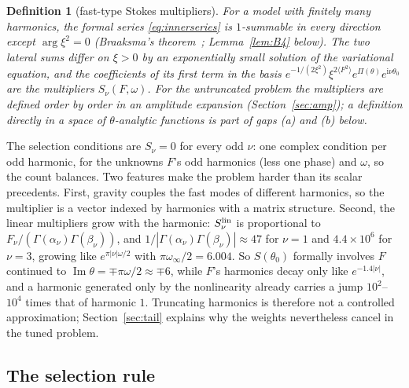 \documentclass{amsart}
\numberwithin{equation}{section}
\theoremstyle{plain}
\newtheorem{definition}{Definition}[section]
\theoremstyle{definition}
\theoremstyle{remark}
\newcommand{\winf}{\omega_\infty}
\newcommand{\im}{\operatorname{Im}}
\newcommand{\iu}{\mathrm{i}}
\begin{document}
\begin{definition}[fast-type Stokes multipliers]\label{def:mult}
For a model with finitely many harmonics, the formal series \eqref{eq:innerseries} is $1$-summable in every direction
except $\arg\xi^2 = 0$ (Braaksma's theorem~\cite{Braaksma1992}; Lemma~\ref{lem:B4} below). The two lateral sums differ
on $\xi > 0$ by an exponentially small solution of the variational equation, and the coefficients of its first term in
the basis $e^{-1/(2\xi^2)}\xi^{2\langle F^2\rangle}e^{\Pi(\theta)}e^{\iu\nu\theta_0}$ are the multipliers $S_\nu(F,\omega)$.
For the untruncated problem the multipliers are defined order by order in an amplitude expansion
(Section~\ref{sec:amp}); a definition directly in a space of $\theta$-analytic functions is part of gaps (a) and (b)
below.
\end{definition}

The selection conditions are $S_\nu = 0$ for every odd $\nu$: one complex condition per odd harmonic, for the unknowns
$F$'s odd harmonics (less one phase) and $\omega$, so the count balances. Two features make the problem harder than its
scalar precedents. First, gravity couples the fast modes of different harmonics, so the multiplier is a vector indexed
by harmonics with a matrix structure. Second, the linear multipliers grow with the harmonic: $S^{\rm lin}_\nu$ is
proportional to $F_\nu/(\Gamma(\alpha_\nu)\Gamma(\beta_\nu))$, and $1/|\Gamma(\alpha_\nu)\Gamma(\beta_\nu)| \approx 47$ for
$\nu = 1$ and $4.4\times10^6$ for $\nu = 3$, growing like $e^{\pi|\nu|\omega/2}$ with $\pi\winf/2 = 6.004$. So $S(\theta_0)$
formally involves $F$ continued to $\im\theta = \mp\pi\omega/2 \approx \mp6$, while $F$'s harmonics decay only like
$e^{-1.4|\nu|}$, and a harmonic generated only by the nonlinearity already carries a jump $10^2$--$10^4$ times that of
harmonic $1$. Truncating harmonics is therefore not a controlled approximation; Section~\ref{sec:tail} explains why the
weights nevertheless cancel in the tuned problem.

\subsection{The selection rule}
\end{document}
